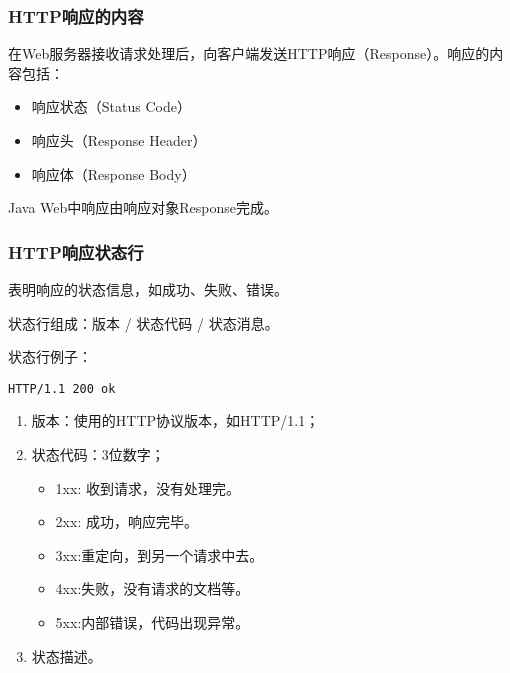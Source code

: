 \begin{frame}[fragile] %
\frametitle{HTTP响应的内容}

在Web服务器接收请求处理后，向客户端发送HTTP响应（Response）。响应的内容包括：
\begin{itemize}
\item 响应状态（Status Code）
\item 响应头（Response Header）
\item 响应体（Response Body）
\end{itemize}

Java Web中响应由响应对象Response完成。
\end{frame}

\begin{frame} %
\frametitle{HTTP响应状态行} 

表明响应的状态信息，如成功、失败、错误。

状态行组成：版本 / 状态代码 / 状态消息。

状态行例子：
\begin{verbatim}
HTTP/1.1 200 ok
\end{verbatim}
\begin{enumerate}
\item 版本：使用的HTTP协议版本，如HTTP/1.1；
\item 状态代码：3位数字；
  \begin{itemize}
  \item 1xx: 收到请求，没有处理完。
  \item 2xx: 成功，响应完毕。
  \item 3xx:重定向，到另一个请求中去。
  \item 4xx:失败，没有请求的文档等。
  \item 5xx:内部错误，代码出现异常。
  \end{itemize}
\item 状态描述。
\end{enumerate}
\end{frame}

